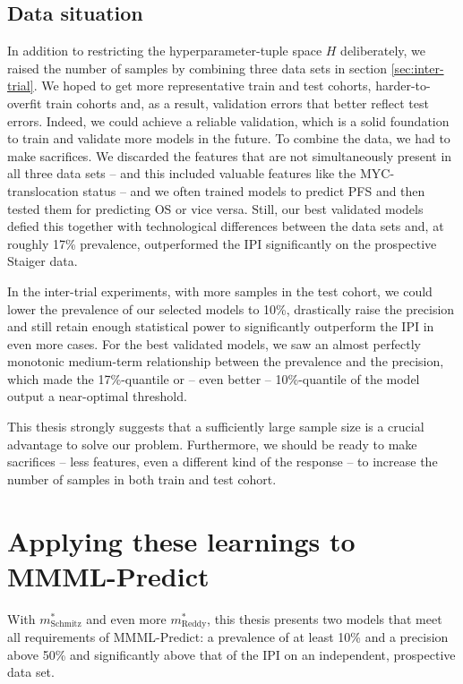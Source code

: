 \subsection{Data situation}\label{subsec:discussion-data}

In addition to restricting the hyperparameter-tuple space $H$ deliberately, we raised the number of 
samples by combining three data sets in section \ref{sec:inter-trial}. We hoped to get more representative train and 
test cohorts, harder-to-overfit train cohorts and, as a result, validation errors that better 
reflect test errors. Indeed, we could achieve a reliable validation, which is 
a solid foundation to train and validate more models in the future. To combine the data, we had to 
make sacrifices. We discarded the features that are not simultaneously present in all three data sets -- and this 
included valuable features like the MYC-translocation status \cite{klapper08} -- and we often trained 
models to predict PFS and then tested them for predicting OS or vice versa. Still, our best 
validated models defied this together with technological differences between the data sets and, at 
roughly \num{17}\% prevalence, outperformed the IPI significantly on the prospective Staiger data.

In the inter-trial experiments, with more samples in the test cohort, we could lower the prevalence 
of our selected models to \num{10}\%, drastically raise the precision and still retain enough 
statistical power to significantly outperform the IPI in even more cases. For the best validated models, 
we saw an almost perfectly monotonic medium-term relationship between the prevalence 
and the precision, which made the \num{17}\%-quantile or -- even better -- \num{10}\%-quantile of 
the model output a near-optimal threshold. 

This thesis strongly suggests that a sufficiently large sample size is a crucial advantage to solve 
our problem. Furthermore, we should be ready to make sacrifices -- less features, 
even a different kind of the response -- to increase the number of samples in both train and test 
cohort. 

\section{Applying these learnings to MMML-Predict}\label{subsec:discussion-mmml}

With $m^*_\text{Schmitz}$ and even more $m^*_\text{Reddy}$, this thesis presents two 
models that meet all requirements of MMML-Predict: a prevalence of at least \num{10}\% and a 
precision above \num{50}\% and significantly above that of the IPI on an independent, prospective 
data set. 

